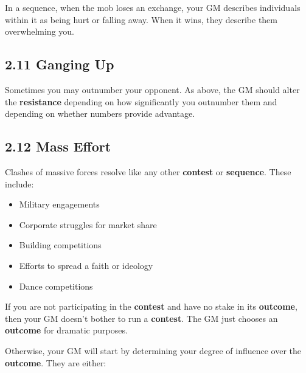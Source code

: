 \documentclass[
  11pt,
]{article}
\providecommand{\tightlist}{%
  \setlength{\itemsep}{0pt}\setlength{\parskip}{0pt}}
\begin{document}
In a sequence, when the mob loses an exchange, your GM describes
individuals within it as being hurt or falling away. When it wins, they
describe them overwhelming you.

\hypertarget{ganging-up}{%
\subsection{2.11 Ganging Up}\label{ganging-up}}

Sometimes you may outnumber your opponent. As above, the GM should alter
the \textbf{resistance} depending on how significantly you outnumber
them and depending on whether numbers provide advantage.

\hypertarget{mass-effort}{%
\subsection{2.12 Mass Effort}\label{mass-effort}}

Clashes of massive forces resolve like any other \textbf{contest} or
\textbf{sequence}. These include:

\begin{itemize}
\tightlist
\item
  Military engagements
\item
  Corporate struggles for market share
\item
  Building competitions
\item
  Efforts to spread a faith or ideology
\item
  Dance competitions
\end{itemize}

If you are not participating in the \textbf{contest} and have no stake
in its \textbf{outcome}, then your GM doesn't bother to run a
\textbf{contest}. The GM just chooses an \textbf{outcome} for dramatic
purposes.

Otherwise, your GM will start by determining your degree of influence
over the \textbf{outcome}. They are either:
\end{document}
